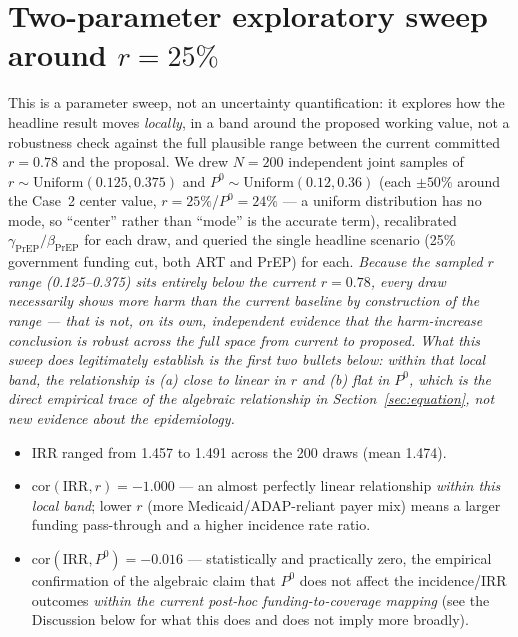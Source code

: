 \documentclass[12pt]{article}
\newcommand{\note}[1]{{\color{noteblue}\textit{#1}}}
\begin{document}
\section{Two-parameter exploratory sweep around $r=25\%$}
\label{sec:mc}

This is a parameter sweep, not an uncertainty quantification: it explores
how the headline result moves \emph{locally}, in a band around the proposed
working value, not a robustness check against the full plausible range
between the current committed $r=0.78$ and the proposal. We drew $N=200$
independent joint samples of $r \sim \text{Uniform}(0.125, 0.375)$ and $P^0
\sim \text{Uniform}(0.12, 0.36)$ (each $\pm 50\%$ around the Case~2 center
value, $r=25\%$/$P^0=24\%$ --- a uniform distribution has no mode, so
``center'' rather than ``mode'' is the accurate term), recalibrated
$\gamma_{\text{PrEP}}/\beta_{\text{PrEP}}$ for each draw, and queried the
single headline scenario (25\% government funding cut, both ART and PrEP)
for each. \note{Because the sampled $r$ range (0.125--0.375) sits entirely
below the current $r=0.78$, every draw necessarily shows more harm than the
current baseline by construction of the range --- that is not, on its own,
independent evidence that the harm-increase conclusion is robust across the
full space from current to proposed. What this sweep \emph{does}
legitimately establish is the first two bullets below: within that local
band, the relationship is (a) close to linear in $r$ and (b) flat in $P^0$,
which is the direct empirical trace of the algebraic relationship in
Section~\ref{sec:equation}, not new evidence about the epidemiology.}

\begin{itemize}
  \item IRR ranged from 1.457 to 1.491 across the 200 draws (mean 1.474).
  \item $\text{cor}(\text{IRR}, r) = -1.000$ --- an almost perfectly linear
    relationship \emph{within this local band}; lower $r$ (more
    Medicaid/ADAP-reliant payer mix) means a larger funding pass-through and
    a higher incidence rate ratio.
  \item $\text{cor}(\text{IRR}, P^0) = -0.016$ --- statistically and
    practically zero, the empirical confirmation of the algebraic claim
    that $P^0$ does not affect the incidence/IRR outcomes \emph{within the
    current post-hoc funding-to-coverage mapping} (see the Discussion below
    for what this does and does not imply more broadly).
\end{itemize}
\end{document}
